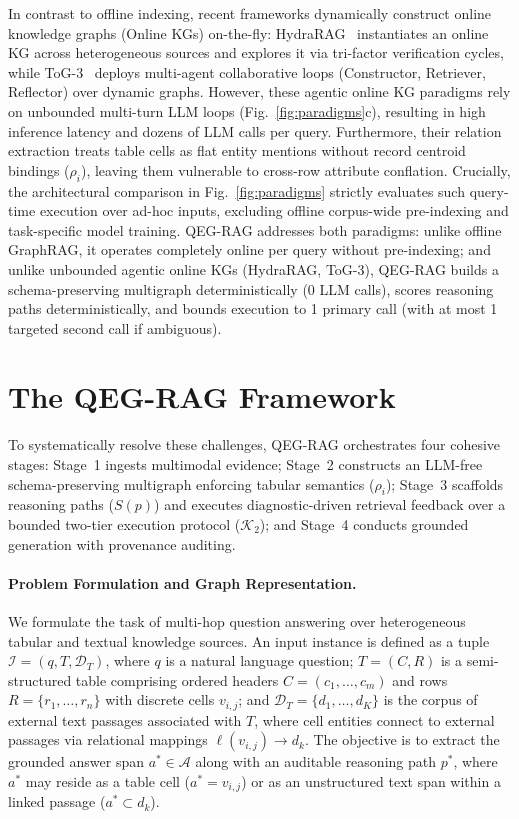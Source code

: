 \documentclass[runningheads]{llncs}
\begin{document}
In contrast to offline indexing, recent frameworks dynamically construct online knowledge graphs (Online KGs) on-the-fly: HydraRAG~\cite{tan2025hydrarag} instantiates an online KG across heterogeneous sources and explores it via tri-factor verification cycles, while ToG-3~\cite{wu2025tog3} deploys multi-agent collaborative loops (Constructor, Retriever, Reflector) over dynamic graphs. However, these agentic online KG paradigms rely on unbounded multi-turn LLM loops (Fig.~\ref{fig:paradigms}c), resulting in high inference latency and dozens of LLM calls per query. Furthermore, their relation extraction treats table cells as flat entity mentions without record centroid bindings ($\rho_i$), leaving them vulnerable to cross-row attribute conflation. Crucially, the architectural comparison in Fig.~\ref{fig:paradigms} strictly evaluates such query-time execution over ad-hoc inputs, excluding offline corpus-wide pre-indexing and task-specific model training. QEG-RAG addresses both paradigms: unlike offline GraphRAG, it operates completely online per query without pre-indexing; and unlike unbounded agentic online KGs (HydraRAG, ToG-3), QEG-RAG builds a schema-preserving multigraph deterministically (0 LLM calls), scores reasoning paths deterministically, and bounds execution to 1 primary call (with at most 1 targeted second call if ambiguous).

\section{The QEG-RAG Framework}
\label{sec:method}



To systematically resolve these challenges, QEG-RAG orchestrates four cohesive stages: Stage~1 ingests multimodal evidence; Stage~2 constructs an LLM-free schema-preserving multigraph enforcing tabular semantics ($\rho_i$); Stage~3 scaffolds reasoning paths ($S(p)$) and executes diagnostic-driven retrieval feedback over a bounded two-tier execution protocol ($\mathcal{K}_2$); and Stage~4 conducts grounded generation with provenance auditing.

\paragraph{Problem Formulation and Graph Representation.}
\label{sec:formulation}
We formulate the task of multi-hop question answering over heterogeneous tabular and textual knowledge sources. An input instance is defined as a tuple $\mathcal{I} = (q, T, \mathcal{D}_T)$, where $q$ is a natural language question; $T = (C, R)$ is a semi-structured table comprising ordered headers $C = (c_1, \dots, c_m)$ and rows $R = \{r_1, \dots, r_n\}$ with discrete cells $v_{i,j}$; and $\mathcal{D}_T = \{d_1, \dots, d_K\}$ is the corpus of external text passages associated with $T$, where cell entities connect to external passages via relational mappings $\ell(v_{i,j}) \rightarrow d_k$. The objective is to extract the grounded answer span $a^* \in \mathcal{A}$ along with an auditable reasoning path $p^*$, where $a^*$ may reside as a table cell ($a^* = v_{i,j}$) or as an unstructured text span within a linked passage ($a^* \subset d_k$).
\end{document}
